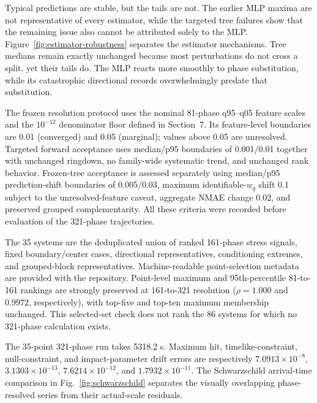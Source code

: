 \documentclass[11pt]{article}
\newcommand{\wq}{w_q}
\begin{document}
Typical predictions are stable, but the tails are not. The earlier MLP maxima
are not representative of every estimator, while the targeted tree failures
show that the remaining issue also cannot be attributed solely to the MLP.
Figure~\ref{fig:estimator-robustness} separates the estimator mechanisms. Tree
medians remain exactly unchanged because most perturbations do not cross a
split, yet their tails do. The MLP reacts more smoothly to phase substitution,
while its catastrophic directional records overwhelmingly predate that
substitution.



The frozen resolution protocol uses the nominal 81-phase q95--q05 feature
scales and the $10^{-12}$ denominator floor defined in Section~7. Its
feature-level boundaries are 0.01 (converged) and 0.05 (marginal); values above
0.05 are unresolved. Targeted forward acceptance uses median/p95 boundaries of
0.001/0.01 together with unchanged ringdown, no family-wide systematic trend,
and unchanged rank behavior. Frozen-tree acceptance is assessed separately
using median/p95 prediction-shift boundaries of 0.005/0.03, maximum
identifiable-$\wq$ shift 0.1 subject to the unresolved-feature caveat,
aggregate NMAE change 0.02, and preserved grouped complementarity. All these
criteria were recorded before evaluation of the 321-phase trajectories.

The 35 systems are the deduplicated union of ranked 161-phase stress signals,
fixed boundary/center cases, directional representatives, conditioning
extremes, and grouped-block representatives. Machine-readable point-selection
metadata are provided with the repository. Point-level maximum and 95th-percentile
81-to-161 rankings are strongly preserved at 161-to-321 resolution
($\rho=1.000$ and $0.9972$, respectively), with top-five and top-ten maximum
membership unchanged. This selected-set check does not rank the 86 systems for
which no 321-phase calculation exists.

The 35-point 321-phase run takes 5318.2 s. Maximum hit, timelike-constraint,
null-constraint, and impact-parameter drift errors are respectively
$7.0913\times10^{-8}$, $3.1303\times10^{-13}$,
$7.6214\times10^{-12}$, and $1.7932\times10^{-11}$.
The Schwarzschild arrival-time comparison in Fig.~\ref{fig:schwarzschild}
separates the visually overlapping phase-resolved series from their actual-scale residuals.
\end{document}
